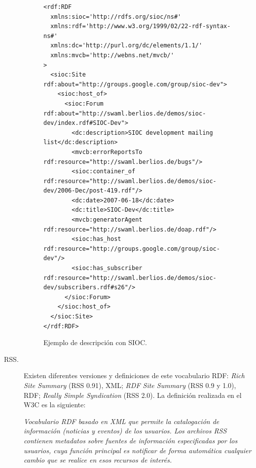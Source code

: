 \begin{description}
\begin{figure}[!htbp]
\centering
  \begin{lstlisting}
<rdf:RDF
  xmlns:sioc='http://rdfs.org/sioc/ns#'
  xmlns:rdf='http://www.w3.org/1999/02/22-rdf-syntax-ns#'
  xmlns:dc='http://purl.org/dc/elements/1.1/'
  xmlns:mvcb='http://webns.net/mvcb/'
>
  <sioc:Site rdf:about="http://groups.google.com/group/sioc-dev">
    <sioc:host_of>
      <sioc:Forum rdf:about="http://swaml.berlios.de/demos/sioc-dev/index.rdf#SIOC-Dev">
        <dc:description>SIOC development mailing list</dc:description>
        <mvcb:errorReportsTo rdf:resource="http://swaml.berlios.de/bugs"/>
        <sioc:container_of rdf:resource="http://swaml.berlios.de/demos/sioc-dev/2006-Dec/post-419.rdf"/>
        <dc:date>2007-06-18</dc:date>
        <dc:title>SIOC-Dev</dc:title>
        <mvcb:generatorAgent rdf:resource="http://swaml.berlios.de/doap.rdf"/>
        <sioc:has_host rdf:resource="http://groups.google.com/group/sioc-dev"/>
        <sioc:has_subscriber rdf:resource="http://swaml.berlios.de/demos/sioc-dev/subscribers.rdf#s26"/>
      </sioc:Forum>
    </sioc:host_of>
  </sioc:Site>
</rdf:RDF>
  \end{lstlisting}
\caption{Ejemplo de descripción con SIOC.}
\label{fig:sioc-example}
\end{figure}

\item[\gls{RSS}.] Existen diferentes versiones y definiciones de este vocabulario RDF: \textit{Rich Site Summary} (RSS 0.91), XML; 
\textit{RDF Site Summary} (RSS 0.9 y 1.0), RDF; \textit{Really Simple Syndication} (RSS 2.0). La definición
realizada en el \gls{W3C} es la siguiente:

\begin{Frame}
\textit{Vocabulario RDF basado en XML que permite la catalogación de información (noticias y eventos) 
de los usuarios. Los archivos RSS contienen metadatos sobre fuentes de información especificadas 
por los usuarios, cuya función principal es notificar de forma automática cualquier cambio que se realice 
en esos recursos de interés.}
\end{Frame}

% 

\end{description}

